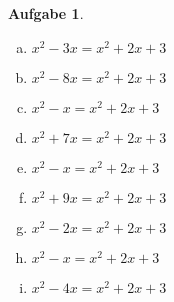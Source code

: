 \documentclass[12pt,fleqn]{article}
\theoremstyle{aufg}
\newtheorem{aufgabe}{Aufgabe}
\theoremstyle{bsp}
\begin{document}
 
    \begin{flushleft}
\begin{center}\end{center}\begin{aufgabe} ~ \\ 
\begin{multicols}{3} 
\begin{enumerate}[a)] 
\item 
$x^{2} - 3 x = x^{2} + 2 x + 3$
\item 
$x^{2} - 8 x = x^{2} + 2 x + 3$
\item 
$x^{2} - x = x^{2} + 2 x + 3$
\item 
$x^{2} + 7 x = x^{2} + 2 x + 3$
\item 
$x^{2} - x = x^{2} + 2 x + 3$
\item 
$x^{2} + 9 x = x^{2} + 2 x + 3$
\item 
$x^{2} - 2 x = x^{2} + 2 x + 3$
\item 
$x^{2} - x = x^{2} + 2 x + 3$
\item 
$x^{2} - 4 x = x^{2} + 2 x + 3$
\end{enumerate} 
\end{multicols} 
\end{aufgabe} 
\end{flushleft} 
\end{document}
